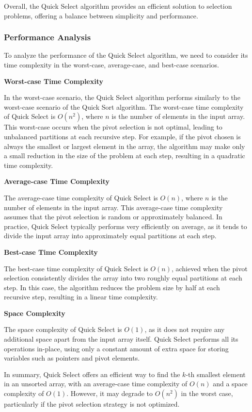\documentclass[12pt]{book} %
\begin{document}
Overall, the Quick Select algorithm provides an efficient solution to selection problems, offering a balance between simplicity and performance.

\subsubsection{Performance Analysis}
To analyze the performance of the Quick Select algorithm, we need to consider its time complexity in the worst-case, average-case, and best-case scenarios.

\textbf{Worst-case Time Complexity}

In the worst-case scenario, the Quick Select algorithm performs similarly to the worst-case scenario of the Quick Sort algorithm. The worst-case time complexity of Quick Select is \(O(n^2)\), where \(n\) is the number of elements in the input array. This worst-case occurs when the pivot selection is not optimal, leading to unbalanced partitions at each recursive step. For example, if the pivot chosen is always the smallest or largest element in the array, the algorithm may make only a small reduction in the size of the problem at each step, resulting in a quadratic time complexity.

\textbf{Average-case Time Complexity}

The average-case time complexity of Quick Select is \(O(n)\), where \(n\) is the number of elements in the input array. This average-case time complexity assumes that the pivot selection is random or approximately balanced. In practice, Quick Select typically performs very efficiently on average, as it tends to divide the input array into approximately equal partitions at each step.

\textbf{Best-case Time Complexity}

The best-case time complexity of Quick Select is \(O(n)\), achieved when the pivot selection consistently divides the array into two roughly equal partitions at each step. In this case, the algorithm reduces the problem size by half at each recursive step, resulting in a linear time complexity.

\textbf{Space Complexity}

The space complexity of Quick Select is \(O(1)\), as it does not require any additional space apart from the input array itself. Quick Select performs all its operations in-place, using only a constant amount of extra space for storing variables such as pointers and pivot elements.

In summary, Quick Select offers an efficient way to find the \(k\)-th smallest element in an unsorted array, with an average-case time complexity of \(O(n)\) and a space complexity of \(O(1)\). However, it may degrade to \(O(n^2)\) in the worst case, particularly if the pivot selection strategy is not optimized.
\end{document}

